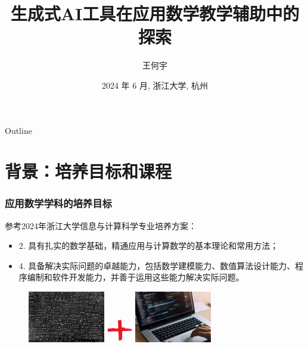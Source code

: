 \documentclass{beamer}
\title[GAI] %
{生成式AI工具在应用数学教学辅助中的探索}
\author[Wang HY] %
{王何宇}
\institute[ZJU] %
{
浙江大学数学科学学院
}
\date[Short Occasion] %
{2024 年 6 月, 浙江大学, 杭州}
\begin{document}
\begin{frame}
 \titlepage
\end{frame}
\begin{frame}{Outline}
  \tableofcontents
\end{frame}

\section{背景：培养目标和课程}
\begin{frame}
\frametitle{应用数学学科的培养目标}
参考2024年浙江大学信息与计算科学专业培养方案：
\begin{itemize}
\item 2. 具有扎实的数学基础，精通应用与计算数学的基本理论和常用方法；
\item 4. 具备解决实际问题的卓越能力，包括数学建模能力、数值算法设计能力、程序编制和软件开发能力，并善于运用这些能力解决实际问题。  
\end{itemize}
\begin{figure}
    \centering 
\includegraphics[width=0.3\textwidth]{images/MATH.jpg}
\includegraphics[width=0.1\textwidth]{images/plus.jpg}
\includegraphics[width=0.3\textwidth]{images/COMPUTER.jpg}
\end{figure}
\end{frame}
\end{document}
